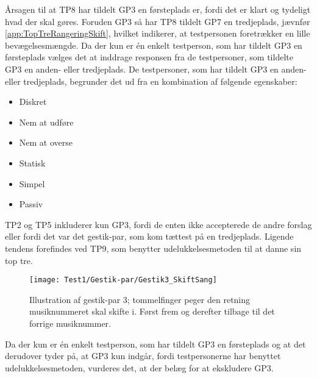 Årsagen til at TP8 har tildelt GP3 en førsteplads er, fordi det er klart og tydeligt hvad der skal gøres. Foruden GP3 så har TP8 tildelt GP7 en tredjeplads, jævnfør \autoref{app:TopTreRangeringSkift}, hvilket indikerer, at testpersonen foretrækker en lille bevægelsesmængde. Da der kun er én enkelt testperson, som har tildelt GP3 en førsteplads vælges det at inddrage responsen fra de testpersoner, som tildelte GP3 en anden- eller tredjeplads. De testpersoner, som har tildelt GP3 en anden- eller tredjeplads, begrunder det ud fra en kombination af følgende egenskaber: 
%
\begin{multicols}{3}
    \begin{itemize}
        \item Diskret
        \item Nem at udføre
        \item Nem at overse
        \item Statisk
        \item Simpel
        \item Passiv
\end{itemize}
\end{multicols}
\noindent
%
TP2 og TP5 inkluderer kun GP3, fordi de enten ikke accepterede de andre forslag eller fordi det var det gestik-par, som kom tættest på en tredjeplads. Ligende tendens forefindes ved TP9, som benytter udelukkelsesmetoden til at danne sin top tre.
%
\begin{figure}[H]
	\centering
	\texttt{[image: Test1/Gestik-par/Gestik3\_SkiftSang]}
	\caption{Illustration af gestik-par 3; tommelfinger peger den retning musiknummeret skal skifte i. Først frem og derefter tilbage til det forrige musiknummer.}
	\label{fig:GestikPar3Skift}
\end{figure}
\noindent
% 
Da der kun er én enkelt testperson, som har tildelt GP3 en førsteplads og at det derudover tyder på, at GP3 kun indgår, fordi testpersonerne har benyttet udelukkelsesmetoden, vurderes det, at der belæg for at ekskludere GP3.
%
